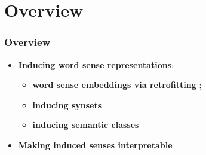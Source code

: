 \section{Overview}

\begin{frame}
  \frametitle{Overview}

  \begin{itemize}
		\item \alert{\textbf{Inducing word sense representations}}:
		\begin{itemize}
		\item \textbf{word sense embeddings via retrofitting} \cite{pelevina-EtAl:2016:RepL4NLP,remus:2018};
		\item \textbf{inducing synsets}~\cite{ustalov-panchenko-biemann:2017:Long,ustalov2017fighting,madoc43362}
		\item \textbf{inducing semantic classes} \cite{panchenko:2018:SemanticClasses} 
				
		\end{itemize}

	
	\pause 
	\vspace{1em}
	\item \alert{\textbf{Making induced senses interpretable}} \cite{panchenko-EtAl:2017:EMNLP2017Demos,panchenko-EtAl:2017:EACLlong}
	
			
\end{itemize}
	
\end{frame}


